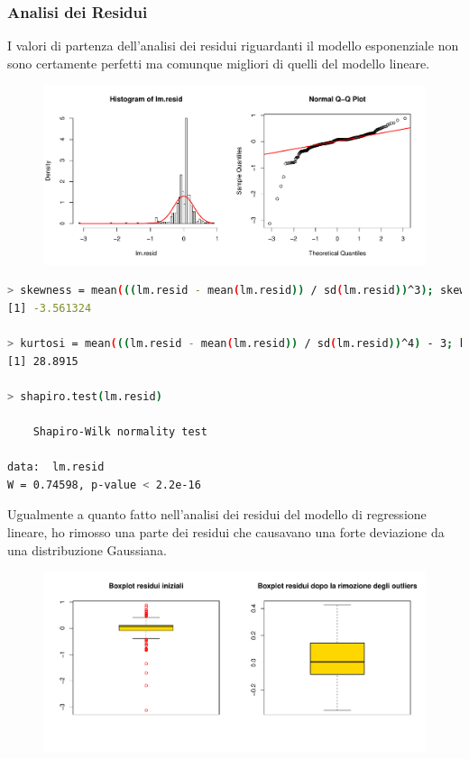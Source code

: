 \documentclass[11pt,a4paper]{article}
\begin{document}
\subsubsection{Analisi dei Residui}
I valori di partenza dell'analisi dei residui riguardanti il modello
esponenziale non sono certamente perfetti ma comunque migliori di quelli del
modello lineare.
\begin{figure}[H]
	\hspace{-1.5cm}
	\includegraphics[scale=0.7]{imgs/residuals_exp.pdf}
\end{figure}
\vspace{-0.8cm}
\begin{lstlisting}[language=bash,basicstyle=\tiny,tabsize=2,frame = single]
> skewness = mean(((lm.resid - mean(lm.resid)) / sd(lm.resid))^3); skewness
[1] -3.561324

> kurtosi = mean(((lm.resid - mean(lm.resid)) / sd(lm.resid))^4) - 3; kurtosi
[1] 28.8915

> shapiro.test(lm.resid)

	Shapiro-Wilk normality test

data:  lm.resid
W = 0.74598, p-value < 2.2e-16
\end{lstlisting}
Ugualmente a quanto fatto nell'analisi dei residui del modello di regressione
lineare, ho rimosso una parte dei residui che causavano una forte deviazione da
una distribuzione Gaussiana.
\begin{figure}[H]
	\vspace{-1cm}
	\begin{center}
		\hspace*{-1.5cm}
		\includegraphics[scale=0.7]{imgs/residuals_boxplots_exp.pdf}
	\end{center}
\end{figure}
\end{document}
